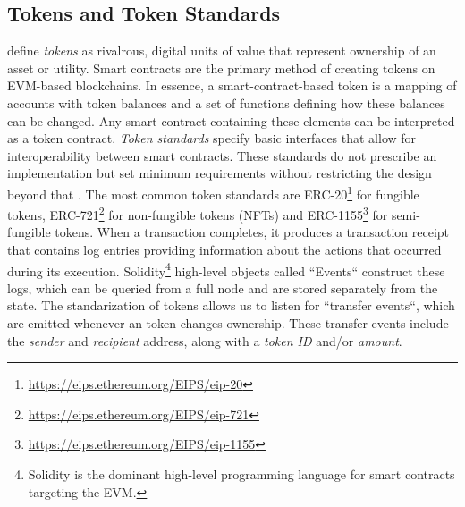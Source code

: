 \documentclass[12pt,a4paper,titlepage,oneside,english]{article}
\begin{document}
\subsection{Tokens and Token Standards}
\cite{roth2019tokenization} define \textit{tokens} as rivalrous, digital units of value that represent ownership of an asset or utility. Smart contracts are the primary method of creating tokens on EVM-based blockchains. In essence, a smart-contract-based token is a mapping of accounts with token balances and a set of functions defining how these balances can be changed. Any smart contract containing these elements can be interpreted as a token contract. \citep{roth2019tokenization} \newline
\textit{Token standards} specify basic interfaces that allow for interoperability between smart contracts. These standards do not prescribe an implementation but set minimum requirements without restricting the design beyond that \citep{mastering_ethereum}. 
The most common token standards are ERC-20\footnote{\url{https://eips.ethereum.org/EIPS/eip-20}} for fungible tokens, ERC-721\footnote{\url{https://eips.ethereum.org/EIPS/eip-721}} for non-fungible tokens (NFTs) and ERC-1155\footnote{\url{https://eips.ethereum.org/EIPS/eip-1155}} for semi-fungible tokens.\newline
When a transaction completes, it produces a transaction receipt  that contains log entries providing information about the actions that occurred during its execution. Solidity\footnote{Solidity is the dominant high-level programming language for smart contracts targeting the EVM.} high-level objects called ``Events`` construct these logs, which can be queried from a full node and are stored separately from the state. \citep{mastering_ethereum} \newline
The standarization of tokens allows us to listen for ``transfer events``, which are emitted whenever an token changes ownership.
These transfer events include the \textit{sender} and \textit{recipient} address, along with a \textit{token ID} and/or \textit{amount}. 

\end{document}
